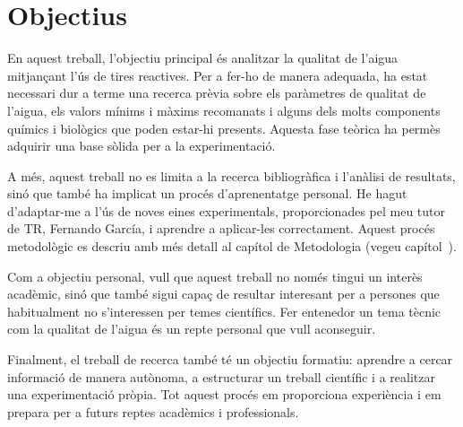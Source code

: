 \chapter{Objectius}

En aquest treball, l’objectiu principal és analitzar la qualitat de l’aigua mitjançant l’ús de tires reactives. Per a fer-ho de manera adequada, ha estat necessari dur a terme una recerca prèvia sobre els paràmetres de qualitat de l’aigua, els valors mínims i màxims recomanats i alguns dels molts components químics i biològics que poden estar-hi presents. Aquesta fase teòrica ha permès adquirir una base sòlida per a la experimentació.

A més, aquest treball no es limita a la recerca bibliogràfica i l’anàlisi de resultats, sinó que també ha implicat un procés d’aprenentatge personal. He hagut d’adaptar-me a l’ús de noves eines experimentals, proporcionades pel meu tutor de TR, Fernando García, i aprendre a aplicar-les correctament. Aquest procés metodològic es descriu amb més detall al capítol de Metodologia (vegeu capítol~).

Com a objectiu personal, vull que aquest treball no només tingui un interès acadèmic, sinó que també sigui capaç de resultar interesant per a persones que habitualment no s’interessen per temes científics. Fer entenedor un tema tècnic com la qualitat de l’aigua és un repte personal que vull aconseguir.

Finalment, el treball de recerca també té un objectiu formatiu: aprendre a cercar informació de manera autònoma, a estructurar un treball científic i a realitzar una experimentació pròpia. Tot aquest procés em proporciona experiència i em prepara per a futurs reptes acadèmics i professionals.

